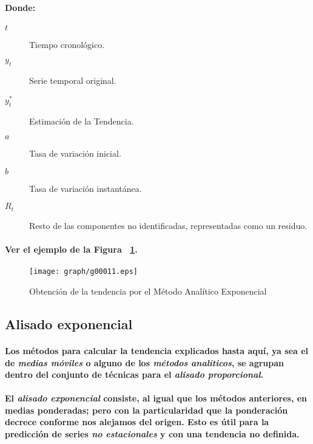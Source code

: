 \paragraph{
Donde:
}
\begin{description}
\item[$t$] Tiempo cronológico.
\item[$y_t$] Serie temporal original.
\item[$y_t^*$] Estimación de la Tendencia.
\item[$a$] Tasa de variación inicial.
\item[$b$] Tasa de variación instantánea.
\item[$R_t$] Resto de las componentes no identificadas, representadas como un residuo.
\end{description}
\paragraph{
Ver el ejemplo de la Figura ~\ref{fig:TendenciaMetodoAnaliticoExponencial}.
}
\begin{figure}[ht]
\centering
\texttt{[image: graph/g00011.eps]}
\caption[Método Analítico Exponencial]{Obtención de la tendencia por el Método Analítico Exponencial}
\label{fig:TendenciaMetodoAnaliticoExponencial}
\end{figure}


\subsection{Alisado exponencial}
\paragraph{
Los métodos para calcular la tendencia explicados hasta aquí, ya sea el de \emph{medias móviles} o alguno de los \emph{métodos analíticos}, se agrupan dentro del conjunto de técnicas para el \emph{alisado proporcional}.
}
\paragraph{
El \emph{alisado exponencial} consiste, al igual que los métodos anteriores, en medias ponderadas; pero con la particularidad que la ponderación decrece conforme nos alejamos del origen. Esto es útil para la predicción de series \emph{no estacionales} y con una tendencia no definida.
}

